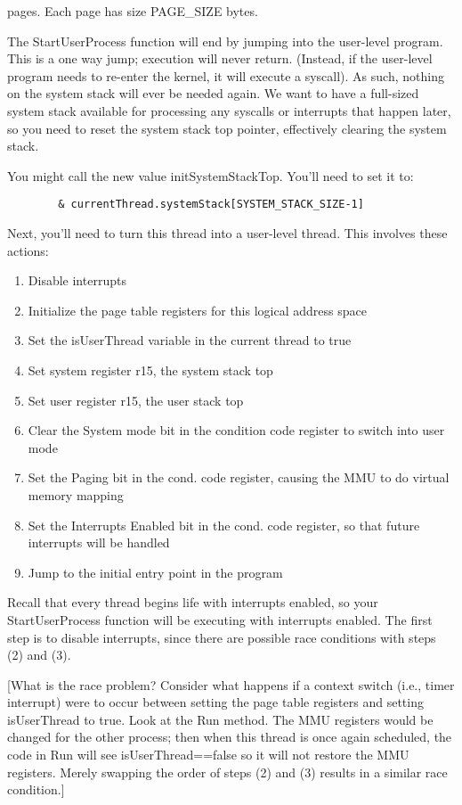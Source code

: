 \documentclass[12pt]{article}
\begin{document}
pages.  Each page has size PAGE\_SIZE bytes.

The StartUserProcess function will end by jumping into the user-level
program.  This is a one way jump; execution will never return.
(Instead, if the user-level program needs to re-enter the kernel, it
will execute a syscall).  As such, nothing on the system stack will
ever be needed again.  We want to have a full-sized system stack
available for processing any syscalls or interrupts that happen later,
so you need to reset the system stack top pointer, effectively
clearing the system stack.

You might call the new value initSystemStackTop.  You'll need to set
it to:

\begin{verbatim}
        & currentThread.systemStack[SYSTEM_STACK_SIZE-1]
\end{verbatim}

Next, you'll need to turn this thread into a user-level thread.  This
involves these actions:

\begin{enumerate}
\item  Disable interrupts
\item  Initialize the page table registers for this logical address space
\item  Set the isUserThread variable in the current thread to true
\item  Set system register r15, the system stack top
\item  Set user register r15, the user stack top
\item Clear the System mode bit in the condition code register to
  switch into user mode
\item Set the Paging bit in the cond. code register, causing the MMU
  to do virtual memory mapping
\item Set the Interrupts Enabled bit in the cond. code register, so
  that future interrupts will be handled
\item  Jump to the initial entry point in the program
\end{enumerate}

Recall that every thread begins life with interrupts enabled, so your
StartUserProcess function will be executing with interrupts enabled.
The first step is to disable interrupts, since there are possible race
conditions with steps (2) and (3).

[What is the race problem?  Consider what happens if a context switch
(i.e., timer interrupt) were to occur between setting the page table
registers and setting isUserThread to true.  Look at the Run method.
The MMU registers would be changed for the other process; then when
this thread is once again scheduled, the code in Run will see
isUserThread==false so it will not restore the MMU registers.  Merely
swapping the order of steps (2) and (3) results in a similar race
condition.]
\end{document}
